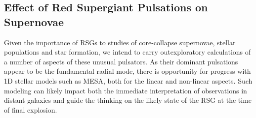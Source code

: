 \subsection{Effect of Red Supergiant Pulsations on Supernovae}

Given the importance of RSGs to studies of core-collapse supernovae, stellar populations and star formation, we intend to carry outexploratory calculations of a number of aspects of these unusual
pulsators. As their dominant pulsations appear to be the fundamental
radial mode, there is opportunity for progress with 1D stellar models
such as MESA, both for the linear and non-linear aspects. Such
modeling can likely impact both the immediate interpretation of observations in
distant galaxies and guide the thinking on the likely state of the RSG
at the time of final explosion. 